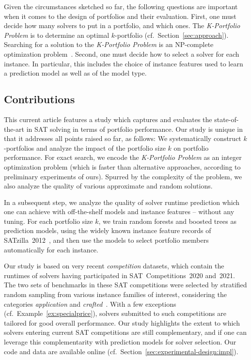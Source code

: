 \documentclass[a4paper,USenglish,pdfa]{lipics-v2021} %
\begin{document}
Given the circumstances sketched so far, the following questions are important when it comes to the design of portfolios and their evaluation. 
First, one must decide how many solvers to put in a portfolio, and which ones. 
The \emph{K-Portfolio Problem} is to determine an optimal $k$-portfolio (cf.\ Section~\ref{sec:approach}). 
Searching for a solution to the \emph{K-Portfolio Problem} is an NP-complete optimization problem~\cite{nof2020real}. 
Second, one must decide how to select a solver for each instance. 
In particular, this includes the choice of instance features used to learn a prediction model as well as of the model type. 

\subsection{Contributions}

This current article features a study which captures and evaluates the state-of-the-art in SAT solving in terms of portfolio performance. 
Our study is unique in that it addresses all points raised so far, as follows:
We systematically construct $k$-portfolios and analyze the impact of the portfolio size $k$ on portfolio performance. 
For exact search, we encode the \emph{K-Portfolio Problem} as an integer optimization problem (which is faster than alternative approaches, according to preliminary experiments of ours). 
Spurred by the complexity of the problem, we also analyze the quality of various approximate and random solutions. 

In a subsequent step, we analyze the quality of solver runtime prediction which one can achieve with off-the-shelf models and instance features -- without any tuning.
For each portfolio size $k$, we train random forests and boosted trees as prediction models, using the widely known instance feature records of SATzilla~2012~\cite{xu2012satzilla2012}, and then use the models to select portfolio members automatically for each instance. 

Our study is based on very recent \emph{competition} datasets, which contain the runtimes of solvers having participated in SAT~Competitions~2020 and~2021. 
The two sets of benchmarks in these SAT competitions were selected by stratified random sampling from various instance families of interest, considering the categories \emph{application} and \emph{crafted}~\cite{SC2020:AIJ}.
With a few exceptions (cf.~Example~\ref{ex:specialprice}), solvers submitted to such competitions are tailored for good overall performance.
Our study highlights the extent to which solvers entering current SAT competitions are still complementary, and if one can leverage this complementarity with prediction models for solver selection.
Our code and data are available online (cf.~Section~\ref{sec:experimental-design:impl}).
\end{document}
